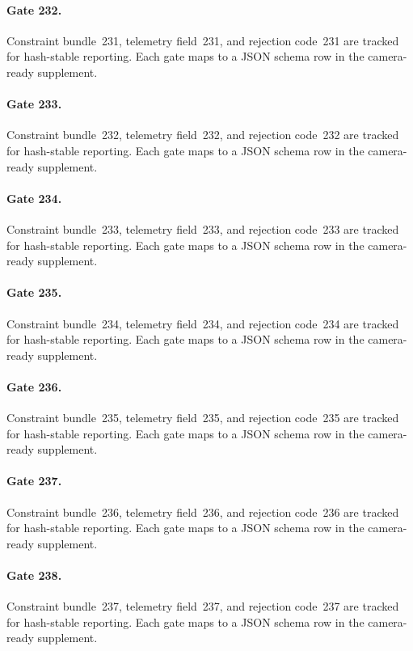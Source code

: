 \documentclass[sigconf,nonacm]{acmart}
\begin{document}
\paragraph{Gate 232.}
Constraint bundle~231, telemetry field~231, and rejection code~231 are tracked for hash-stable reporting. Each gate maps to a JSON schema row in the camera-ready supplement. %

\paragraph{Gate 233.}
Constraint bundle~232, telemetry field~232, and rejection code~232 are tracked for hash-stable reporting. Each gate maps to a JSON schema row in the camera-ready supplement. %

\paragraph{Gate 234.}
Constraint bundle~233, telemetry field~233, and rejection code~233 are tracked for hash-stable reporting. Each gate maps to a JSON schema row in the camera-ready supplement. %

\paragraph{Gate 235.}
Constraint bundle~234, telemetry field~234, and rejection code~234 are tracked for hash-stable reporting. Each gate maps to a JSON schema row in the camera-ready supplement. %

\paragraph{Gate 236.}
Constraint bundle~235, telemetry field~235, and rejection code~235 are tracked for hash-stable reporting. Each gate maps to a JSON schema row in the camera-ready supplement. %

\paragraph{Gate 237.}
Constraint bundle~236, telemetry field~236, and rejection code~236 are tracked for hash-stable reporting. Each gate maps to a JSON schema row in the camera-ready supplement. %

\paragraph{Gate 238.}
Constraint bundle~237, telemetry field~237, and rejection code~237 are tracked for hash-stable reporting. Each gate maps to a JSON schema row in the camera-ready supplement. %
\end{document}
